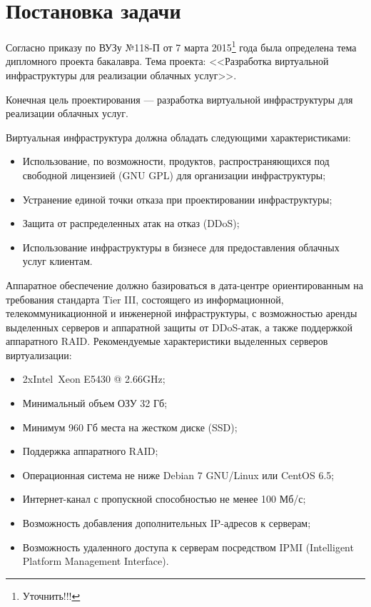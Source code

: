 \section{Постановка задачи}
Согласно приказу по ВУЗу №118-П от 7 марта 2015\footnote{Уточнить!!!} года была определена тема дипломного проекта бакалавра.
Тема проекта: <<Разработка виртуальной инфраструктуры для реализации облачных услуг>>.

Конечная цель проектирования --- разработка виртуальной инфраструктуры для реализации облачных услуг.

Виртуальная инфраструктура должна обладать следующими характеристиками:
\begin{itemize}
    \item Использование, по возможности, продуктов, распространяющихся под свободной лицензией (GNU GPL) для организации инфраструктуры;
    \item Устранение единой точки отказа при проектировании инфраструктуры;
    \item Защита от распределенных атак на отказ (DDoS);
    \item Использование инфраструктуры в бизнесе для предоставления облачных услуг клиентам.
\end{itemize}

Аппаратное обеспечение должно базироваться в дата-центре ориентированным на требования стандарта Tier III, состоящего из информационной, телекоммуникационной и инженерной инфраструктуры, с возможностью аренды выделенных серверов и аппаратной защиты от DDoS-атак, а также поддержкой аппаратного RAID.
Рекомендуемые характеристики выделенных серверов виртуализации:
\begin{itemize}
    \item 2xIntel\textregistered~Xeon E5430 @ 2.66GHz;
    \item Минимальный объем ОЗУ 32 Гб;
    \item Минимум 960 Гб места на жестком диске (SSD);
    \item Поддержка аппаратного RAID;
    \item Операционная система не ниже Debian 7 GNU/Linux или CentOS 6.5;
    \item Интернет-канал с пропускной способностью не менее 100 Мб/с;
    \item Возможность добавления дополнительных IP-адресов к серверам;
    \item Возможность удаленного доступа к серверам посредством IPMI (Intelligent Platform Management Interface).
\end{itemize}

